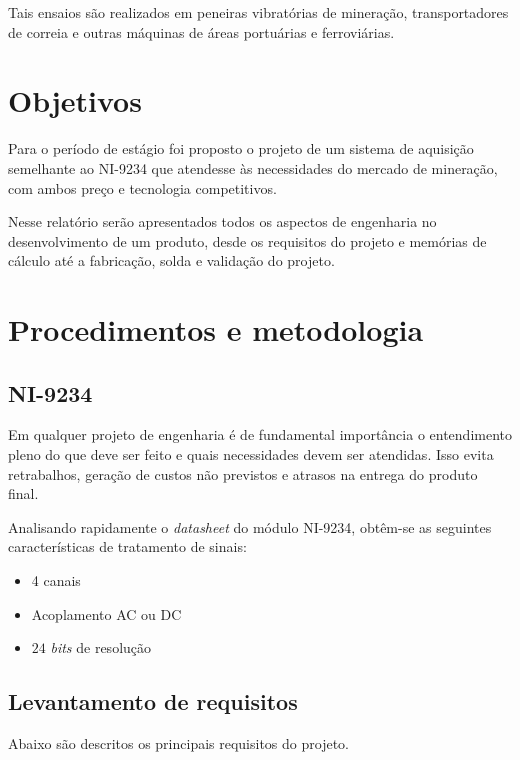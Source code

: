 \documentclass[11pt]{abntex2}
\begin{document}
		Tais ensaios são realizados em peneiras vibratórias de mineração,
		transportadores de correia e outras máquinas de áreas portuárias e ferroviárias. 
	
	\chapter{Objetivos}
		Para o período de estágio foi proposto o projeto de um sistema de aquisição
		semelhante ao NI-9234 que atendesse às necessidades do mercado de mineração,
		com ambos preço e tecnologia competitivos.

		Nesse relatório serão apresentados todos os aspectos de engenharia no
		desenvolvimento de um produto, desde os requisitos do projeto e memórias de
		cálculo até a fabricação, solda e validação do projeto.
		
	\chapter{Procedimentos e metodologia}
		\section{NI-9234}
			Em qualquer projeto de engenharia é de fundamental importância o
			entendimento pleno do que deve ser feito e quais necessidades devem ser
			atendidas. Isso evita retrabalhos, geração de custos não previstos e atrasos
			na entrega do produto final.

			Analisando rapidamente o \textit{datasheet} do módulo NI-9234, obtêm-se as seguintes
			características de tratamento de sinais:

			\begin{itemize}
				\item 4 canais
				\item Acoplamento AC ou DC
				\item $24$ \textit{bits} de resolução
			\end{itemize}

		\section{Levantamento de requisitos}
			Abaixo são descritos os principais requisitos do projeto.
\end{document}

